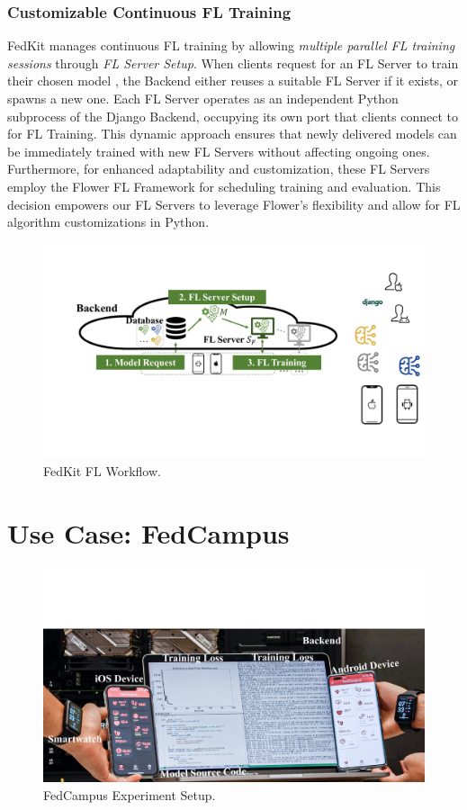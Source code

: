 \documentclass[letterpaper]{article} %
\begin{document}
\subsubsection{Customizable Continuous FL Training}
FedKit manages continuous FL training by allowing \textit{multiple parallel FL training sessions}
through \textit{FL Server Setup}.
When clients request for an FL Server to
train their chosen model \model{},
the Backend either reuses a suitable FL Server \fs{} if it exists,
or spawns a new one.
Each FL Server
operates as an independent Python subprocess of the Django Backend,
occupying its own port that
clients connect to for FL Training.
This dynamic approach ensures that
newly delivered models can be immediately trained with new FL Servers
without affecting ongoing ones.
Furthermore, for enhanced adaptability and customization,
these FL Servers employ the Flower FL Framework for
scheduling training and evaluation.
This decision empowers our FL Servers to leverage Flower's flexibility and
allow for FL algorithm customizations in Python.

\begin{figure}
    \centering
    \includegraphics*[width=0.9\linewidth]{fl_workflow.pdf}
    \caption{FedKit FL Workflow.}
    \label{fig:fl-workflow}
\end{figure}

\section{Use Case: FedCampus}

\begin{figure}
    \centering
    \includegraphics*[width=0.9\linewidth]{fedcampus.pdf}
    \caption{FedCampus Experiment Setup.}
    \label{fig:fedcampus}
\end{figure}
\end{document}
